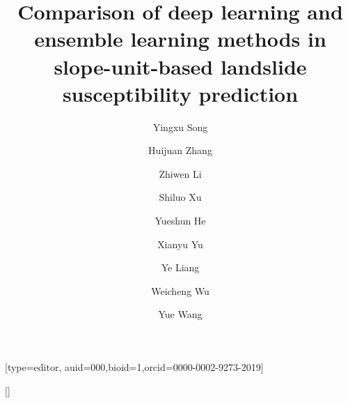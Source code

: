 \documentclass[a4paper,fleqn]{cas-sc}
\begin{document}
\let\WriteBookmarks\relax
\def\floatpagepagefraction{1}
\def\textpagefraction{.001}

\title [mode = title]{Comparison of deep learning and ensemble learning methods in slope-unit-based landslide susceptibility prediction}



\author[1]{Yingxu Song} [type=editor,
auid=000,bioid=1,orcid=0000-0002-9273-2019]

\author[2]{Huijuan Zhang}[]

\author[3]{Zhiwen Li}

\author[4]{Shiluo Xu}

\author[5]{Yueshun He}

\author[7]{Xianyu Yu}

\author[8]{Ye Liang}

\author[1]{Weicheng Wu}

\author[2]{Yue Wang}

\address[1]{School of Earth Sciences, East China University of Technology, Nanchang, Jiangxi Province 330013, China}
\address[2]{Key Lab of Digital Land and Resources and Faculty of Earth Sciences, East China University of Technology, Nanchang, 330013, Jiangxi, China}
\address[3]{Jiangxi Engineering Laboratory on Radioactive Geoscience and Big Data Technology, School of Information and Engineering, East China University of Technology, Nanchang, 330013, Jiangxi, China; yxsong@ecut.edu.cn}
\address[4]{School of Information Engineering, Huzhou University, Huzhou 313000, China; xushiluo@163.com} 
\address[5]{East China University of Technology, Nanchang, 330013, Jiangxi, China; heys@ecut.edu.cn} 
\address[6]{School of Environmental and Chemical Engineering, Foshan University, Foshan, 528000, China; lizw1982@163.com} 
\address[7]{School of Civil Engineering, Architecture and Environment, Hubei University of Technology, Wuhan, Hubei Province 430074, China; yuxianyu@hbut.edu.cn} 
\address[8]{Jiangxi Engineering Technology Research Center of Nuclear Geoscience Data Science and System, East China University of Technology, Nanchang, 330013, Jiangxi, China; liangye@ecut.edu.cn} 
\address[1]{Key Lab of Digital Land and Resources and Faculty of Earth Sciences, East China University of Technology, Nanchang, 330013, Jiangxi, China; wuwch@ecut.edu.cn/wuwc030903@sina.com} 
\address[2]{School of Earth Sciences, East China University of Technology, Nanchang, Jiangxi Province 330013, China; 2020210058@ecut.edu.cn} 
\end{document}

